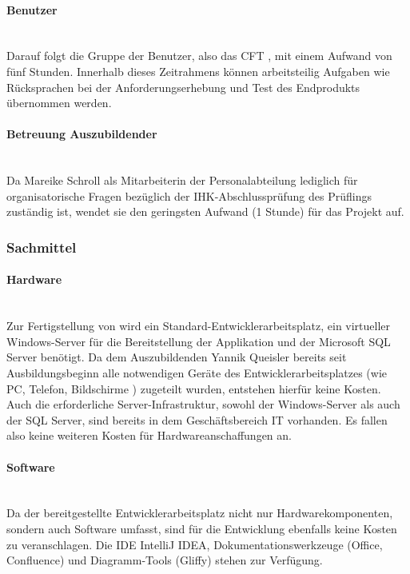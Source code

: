 \paragraph{Benutzer}~\\\label{p:Benutzer}
Darauf folgt die Gruppe der Benutzer, also das \ac{CFT} \teamName, mit einem Aufwand von fünf Stunden. Innerhalb dieses Zeitrahmens können arbeitsteilig Aufgaben wie Rücksprachen bei der Anforderungserhebung und Test des Endprodukts übernommen werden.

\paragraph{Betreuung Auszubildender}~\\\label{p:Betreuung}
Da Mareike Schroll als Mitarbeiterin der Personalabteilung lediglich für organisatorische Fragen bezüglich der IHK-Abschlussprüfung des Prüflings zuständig ist, wendet sie den geringsten Aufwand (1 Stunde) für das Projekt auf.

\subsubsection{Sachmittel}\label{sec:Sachmittel}

\paragraph{Hardware}~\\\label{p:Hardware}
Zur Fertigstellung von \projektName wird ein Standard-Entwicklerarbeitsplatz, ein virtueller Windows-Server für die Bereitstellung der Applikation und der Microsoft SQL Server benötigt. Da dem Auszubildenden Yannik Queisler bereits seit Ausbildungsbeginn alle notwendigen Geräte des Entwicklerarbeitsplatzes (wie PC, Telefon, Bildschirme \etc) zugeteilt wurden, entstehen hierfür keine Kosten. Auch die erforderliche Server-Infrastruktur, sowohl der Windows-Server als auch der SQL Server, sind bereits in dem Geschäftsbereich IT vorhanden. Es fallen also keine weiteren Kosten für Hardwareanschaffungen an.

\paragraph{Software}~\\\label{p:Software}
Da der bereitgestellte Entwicklerarbeitsplatz nicht nur Hardwarekomponenten, sondern auch Software umfasst, sind für die Entwicklung ebenfalls keine Kosten zu veranschlagen. Die \ac{IDE} IntelliJ IDEA, Dokumentationswerkzeuge (Office, Confluence) und Diagramm-Tools (Gliffy) stehen zur Verfügung.

